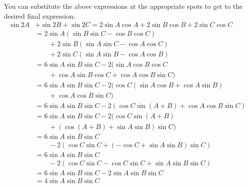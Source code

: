 \documentclass{exam}
\begin{document}
    \pagebreak

    You can substitute the above expressions at the appropriate spots to get to the desired final expression:
    \begin{align*}
      \sin 2A & + \sin 2B + \sin 2C  = 2 \sin A \cos A + 2 \sin B \cos B + 2 \sin C \cos C \\
              & = 2 \sin A ( \sin B \sin C - \cos B \cos C ) \\
                & \qquad{} + 2 \sin B ( \sin A \sin C - \cos A \cos C ) \\
                & \qquad{} + 2 \sin C ( \sin A \sin B - \cos A \cos B ) \\
              & = 6 \sin A \sin B \sin C  - 2 (\sin A \cos B \cos C \\
                & \qquad{} + \cos A \sin B \cos C + \cos A \cos B \sin C) \\
              & = 6 \sin A \sin B \sin C  - 2 ( \cos C ( \sin A \cos B + \cos A \sin B ) \\
                & \qquad{} + \cos A \cos B \sin C) \\
              & = 6 \sin A \sin B \sin C  - 2 ( \cos C \sin (A + B) + \cos A \cos B \sin C) \\
              & = 6 \sin A \sin B \sin C  - 2 ( \cos C \sin (A + B) \\
                & \qquad{} + ( \cos (A + B) + \sin A \sin B ) \sin C) \\
              & = 6 \sin A \sin B \sin C \\
                & \qquad{} - 2 ( \cos C \sin C + ( - \cos C + \sin A \sin B ) \sin C) \\
              & = 6 \sin A \sin B \sin C \\
                & \qquad{} - 2 ( \cos C \sin C  - \cos C \sin C + \sin A \sin B \sin C) \\
              & = 6 \sin A \sin B \sin C  - 2 \sin A \sin B \sin C \\
              & = 4 \sin A \sin B \sin C \\
    \end{align*}
  \fi


  \pagebreak

  \ifprintanswers
\end{document}
